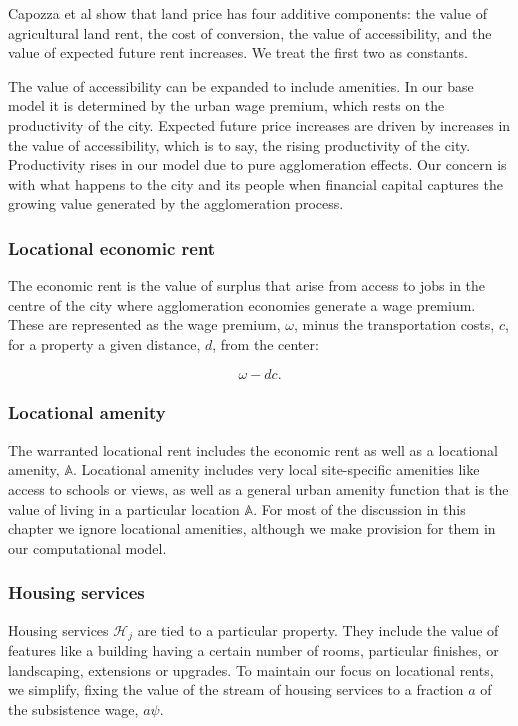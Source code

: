 Capozza et al \cite{capozzaFundamentalsLandPrices1989} show that land price has four additive components: the value of agricultural land rent, the cost of conversion, the value of accessibility, and the value of expected future rent increases. We treat the first two as constants.  

The value of accessibility  can be expanded to include amenities. In our base model it is determined by the urban wage premium, which rests on the productivity of the city. %
Expected future price increases are driven by increases in the value of accessibility, which is to say, the rising productivity of the city. Productivity rises in our model due to pure agglomeration effects. Our concern is with what happens to the city and its people when financial capital captures the growing value generated by the agglomeration process.  


\subsubsection{Locational economic rent} \label{section-economic-rent}
The \gls{economic rent} is the value of surplus that arise from access to jobs in the centre of the city where agglomeration economies generate a wage premium. These are represented as %
the wage premium, $\omega$, minus the transportation costs, $c$, for a property a given distance, $d$, from the center:

\[\omega - {dc}.\]

\subsubsection{Locational amenity} \label{section-locational-rent}
The warranted locational rent includes  the economic rent as well as a locational amenity, $\mathbb{A}$. Locational amenity includes very local site-specific amenities like access to schools or views, as well as a general urban amenity function that is the value of living in a particular location $\mathbb{A}$. For most of the discussion in this chapter we ignore locational amenities, although we make provision for them in our computational model.

\subsubsection{Housing services} \label{section-housing-services}
Housing services $\mathcal{H}_j$ are  tied to a particular property. They include the value of features like a building having a certain number of rooms, particular finishes, or landscaping, extensions or upgrades. To maintain our focus on locational rents, we simplify, fixing %
the value of the stream of housing services to a fraction $a$ of the subsistence wage, $a\psi$.

